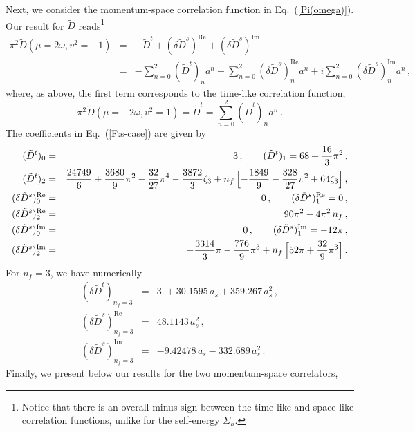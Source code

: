 \documentclass[12pt]{article}
\numberwithin{equation}{section}
\newcommand{\1}[1]{\mathbf{1}^{#1}}
\newcommand{\2}[1]{\mathbf{2}^{#1}}
\newcommand{\3}[1]{\mathbf{3}^{#1}}
\newcommand{\4}[1]{\mathbf{4}^{#1}}
\newcommand{\5}[1]{\mathbf{5}^{#1}}
\newcommand{\tD}{\tilde{D}}
\newlength{\hlength}
\newcommand{\EQN}[1]{\hspace{3mm}\fbox{\fbox{$#1$}} \label{#1}}
\newcommand{\mlabel}[1]{ \text{\footnotesize \hspace{3mm}\fbox{\fbox{$#1$}} \label{#1}}}
\renewcommand{\EQN}[1]{\mlabel{#1}}
\renewcommand{\mlabel}[1]{\label{#1}}
\renewcommand{\EQN}[1]{\label{#1}}
\newcommand{\beq}{\begin{equation}}
\newcommand{\eeq}{\end{equation}}
\newcommand{\re}[1]{(\ref{#1})}
\newcommand{\om}{\omega}
\newcommand{\vv}{v^2}
\begin{document}
Next, we consider the momentum-space correlation function in Eq.~\re{Pi(omega)}.
Our result for $\tD$ reads\footnote{%
Notice that there is an overall minus sign
between the time-like and space-like correlation functions, unlike for the self-energy $\Sigma_h$.}
\begin{eqnarray}
{\pi^2}\tilde{D}(\mu = 2 \om, \vv =-1) &=& -\tilde{D}^t + (\delta \tilde{D}^s)^{\text{Re}} + (\delta \tilde{D}^s)^{\text{Im}}
\nonumber\\
&=&- \sum_{n=0}^2 (\tilde{D}^t)_n a^n + \sum_{n=0}^2 (\delta \tilde{D}^s)^{\text{Re}}_n  a^n
+ i \sum_{n=0}^2 (\delta \tilde{D}^s)^{\text{Im}}_n a^n 
\mlabel{F:s-case}
\,,
\end{eqnarray}
where, as above, the first term corresponds to the time-like correlation function,
\beq
{\pi^2}\tilde{D}(\mu = -2 \om, \vv =1) = \tilde{D}^t = \sum_{n=0}^2 (\tilde{D}^t)_n a^n
\,.
\mlabel{F:t-case}
\eeq
The coefficients in Eq.~(\ref{F:s-case}) are given by
\begin{eqnarray}
 (	\tD^t)_{0}&=&
3\,,\qquad 
(	\tD^t)_{1}=
68+\frac{16}{3} \pi^2
\,,
\nonumber\\
(	\tD^t)_{2}&=&
\frac{24749}{6}+\frac{3680}{9} \pi^2-\frac{32}{27} \pi^4-\frac{3872}{3}  \zeta_{3}
+n_f\, \Bigl[-\frac{1849}{9}-\frac{328}{27} \pi^2+64  \zeta_{3}\Bigr]
\,,
\nonumber\\
(\delta 	\tD^s)^{\text{Re}}_{0}  &=&0\,, 
 \qquad
 (\delta 	\tD^s)^{\text{Re}}_{1}  =0\,,
\nonumber\\
(\delta 	\tD^s)^{\text{Re}}_{2}  &=&
90 \pi^2 
-4 \pi^2\, n_f\,,
\nonumber\\
(\delta 	\tD^s)^{\text{Im}}_0&=&0\,, 
 \qquad
(\delta 	\tD^s)^{\text{Im}}_1=
-12 \pi\,,
\nonumber\\
(\delta 	\tD^s)^{\text{Im}}_2&=&
-\frac{3314}{3} \pi-\frac{776}{9} \pi^3
+n_f\, \Bigl[52 \pi+\frac{32}{9} \pi^3\Bigr]\,.
\label{deltaDIm2}
 \end{eqnarray} 
For $n_f=3$, we have numerically
\begin{eqnarray}
 (\delta 	\tD^t)_{n_f=3}&=&3.+30.1595 \,a_s +359.267 \, a_s^2\,, 
\nonumber\\
(\delta 	\tD^s)_{n_f=3}^{\text{Re}}  &=&48.1143 \, a_s^2 \,,
\nonumber\\
(\delta 	\tD^s)_{n_f=3}^{\text{Im}}  &=&-9.42478 \,a_s -332.689 \, a_s^2\,.
\EQN{deltaDmNL:nf3}
 \end{eqnarray} 
Finally, we  present below our results for the two momentum-space correlators,
\end{document}
